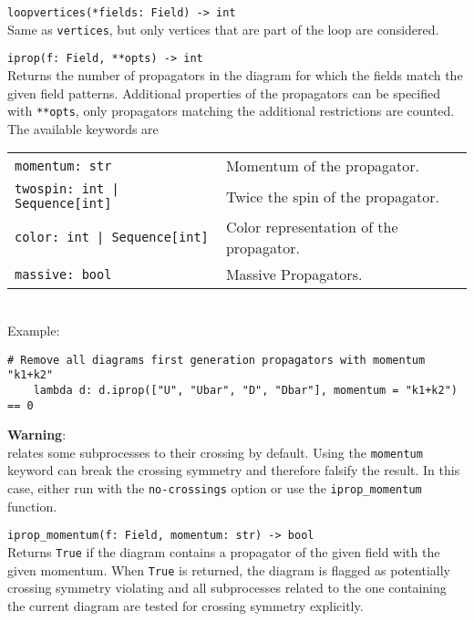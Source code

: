 \begin{basedescript}{\desclabelstyle{\pushlabel}}
   \item[\hspace{-1em}]\colorbox{gray!30}{\lstinline[style=py]|loopvertices(*fields: Field) -> int|} \vspace{0.1cm}\\
   Same as \texttt{vertices}, but only vertices that are part of the loop are considered.

   \item[\hspace{-1em}]\colorbox{gray!30}{\lstinline[style=py]|iprop(f: Field, **opts) -> int|} \vspace{0.1cm}\\
   Returns the number of propagators in the diagram for which the fields match the given field patterns. Additional properties of the propagators can be specified with \texttt{**opts}, only propagators matching the additional restrictions are counted. The available keywords are \\
   \def\arraystretch{1.5}
   \begin{tabular}{l l}
    \colorbox{gray!30}{\lstinline[style=py]|momentum: str|} & Momentum of the propagator. \\
    \colorbox{gray!30}{\lstinline[style=py]{twospin: int | Sequence[int]}} & Twice the spin of the propagator. \\
    \colorbox{gray!30}{\lstinline[style=py]{color: int | Sequence[int]}} & Color representation of the propagator. \\
    \colorbox{gray!30}{\lstinline[style=py]|massive: bool|} & Massive Propagators.
   \end{tabular}
   \def\arraystretch{1.0}
   \vspace{0.2cm} \\
   Example:
   \begin{lstlisting}[style=py]
    # Remove all diagrams first generation propagators with momentum "k1+k2"
    lambda d: d.iprop(["U", "Ubar", "D", "Dbar"], momentum = "k1+k2") == 0
   \end{lstlisting}
   \colorbox{red!15}{\parbox{\linewidth}{\textbf{Warning}: \vspace{0.1cm}\\ \gosam relates some subprocesses to their crossing by default. Using the \texttt{momentum} keyword can break the crossing symmetry and therefore falsify the result. In this case, either run \gosam with the \texttt{no-crossings} option or use the \lstinline[style=py]|iprop_momentum| function.}}

   \item[\hspace{-1em}]\colorbox{gray!30}{\lstinline[style=py]|iprop_momentum(f: Field, momentum: str) -> bool|} \vspace{0.1cm}\\
   Returns \texttt{True} if the diagram contains a propagator of the given field with the given momentum. When \texttt{True} is returned, the diagram is flagged as potentially crossing symmetry violating and all subprocesses related to the one containing the current diagram are tested for crossing symmetry explicitly.


\end{basedescript}
